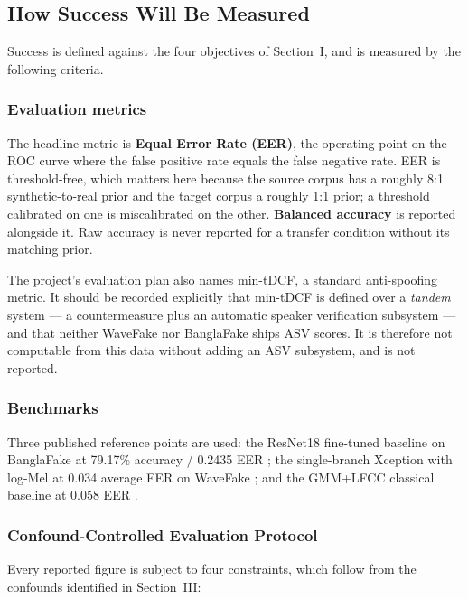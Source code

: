 \documentclass[conference]{IEEEtran}
\begin{document}
\subsection{How Success Will Be Measured}
Success is defined against the four objectives of Section~I, and is measured
by the following criteria.

\subsubsection{Evaluation metrics}
The headline metric is \textbf{Equal Error Rate (EER)}, the operating point on
the ROC curve where the false positive rate equals the false negative rate.
EER is threshold-free, which matters here because the source corpus has a
roughly 8:1 synthetic-to-real prior and the target corpus a roughly 1:1 prior;
a threshold calibrated on one is miscalibrated on the other. \textbf{Balanced
accuracy} is reported alongside it. Raw accuracy is never reported for a
transfer condition without its matching prior.

The project's evaluation plan also names min-tDCF, a standard anti-spoofing
metric. It should be recorded explicitly that min-tDCF is defined over a
\emph{tandem} system --- a countermeasure plus an automatic speaker
verification subsystem --- and that neither WaveFake nor BanglaFake ships ASV
scores. It is therefore not computable from this data without adding an ASV
subsystem, and is not reported.

\subsubsection{Benchmarks}
Three published reference points are used: the ResNet18 fine-tuned baseline on
BanglaFake at 79.17\% accuracy / 0.2435 EER \cite{samu2025zeroshot}; the
single-branch Xception with log-Mel at 0.034 average EER on WaveFake
\cite{ahmed2026melspec}; and the GMM+LFCC classical baseline at 0.058 EER
\cite{frank2021wavefake}.

\subsubsection{Confound-Controlled Evaluation Protocol}
Every reported figure is subject to four constraints, which follow from the
confounds identified in Section~III:
\end{document}

